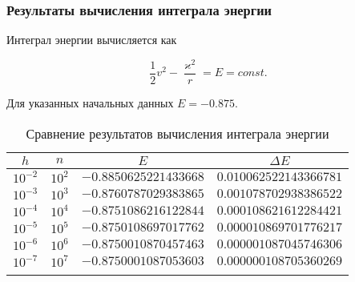 \begin{frame}
\frametitle{Результаты вычисления интеграла энергии}

Интеграл энергии вычисляется как

\su
\begin{equation}
  \frac{1}{2} v^2 - \frac{\varkappa^2}{r} = E = const.
\end{equation}

Для указанных начальных данных $ E = -0.875 $.

\begin{table}[h]
  \centering
  \caption{Сравнение результатов вычисления интеграла энергии}
  \begin{tabular}{cccc}
    \toprule
    $ h $ &
    $ n $ &
    $ E $ &
    $ \Delta E $ \\
    \midrule
    $ 10^{-2} $ & $ 10^2 $ & $ -0.8850625221433668 $ & $ 0.010062522143366781 $ \\
    \arrayrulecolor{black!40}
    \midrule
    $ 10^{-3} $ & $ 10^3 $ & $ -0.8760787029383865 $ & $ 0.001078702938386522 $ \\
    \midrule
    $ 10^{-4} $ & $ 10^4 $ & $ -0.8751086216122844 $ & $ 0.000108621612284421 $ \\
    \midrule
    $ 10^{-5} $ & $ 10^5 $ & $ -0.8750108697017762 $ & $ 0.000010869701776217 $ \\
    \midrule
    $ 10^{-6} $ & $ 10^6 $ & $ -0.8750010870457463 $ & $ 0.000001087045746306 $ \\
    \midrule
    $ 10^{-7} $ & $ 10^7 $ & $ -0.8750001087053603 $ & $ 0.000000108705360269 $ \\
    \arrayrulecolor{black}
    \bottomrule
  \end{tabular}
\end{table}

\end{frame}

